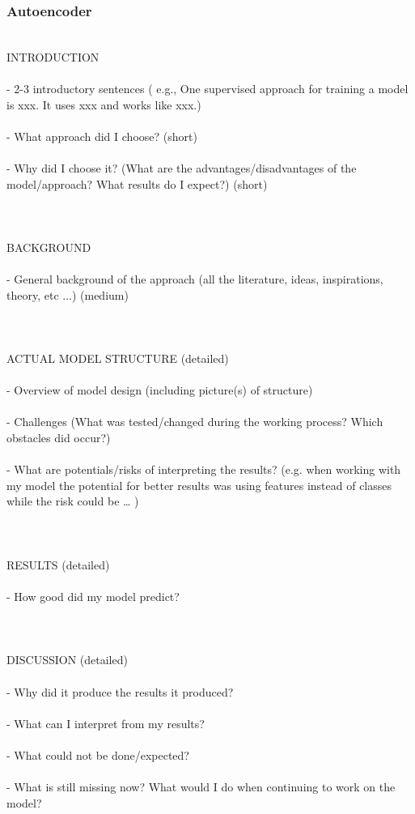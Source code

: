 \subsubsection{Autoencoder}
\\
INTRODUCTION \\
\\ 
- 2-3 introductory sentences ( e.g., One supervised approach for training a model is xxx. It uses xxx and works like xxx.) \\
\\
- What approach did I choose? (short) \\
\\
- Why did I choose it? (What are the advantages/disadvantages of the model/approach? What results do I expect?) (short) \\
\\
\\
\\
BACKGROUND \\
\\
- General background of the approach (all the literature, ideas, inspirations, theory, etc ...) (medium) \\
\\
\\
\\
ACTUAL MODEL STRUCTURE (detailed) \\
\\
- Overview of model design (including picture(s) of structure) \\
\\
- Challenges (What was tested/changed during the working process? Which obstacles did occur?) \\
\\
- What are potentials/risks of interpreting the results? (e.g. when working with my model the potential for better results was using features instead of classes while the risk could be … ) \\
\\
\\
\\
RESULTS (detailed) \\
\\
- How good did my model predict? \\
\\
\\
\\
DISCUSSION (detailed) \\
\\
- Why did it produce the results it produced? \\
\\
- What can I interpret from my results? \\
\\
- What could not be done/expected? \\
\\
- What is still missing now? What would I do when continuing to work on the model? \\
\\

